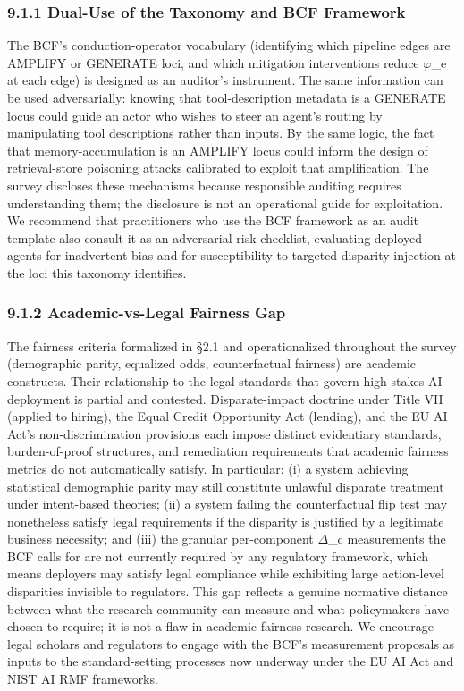 \documentclass[10pt]{article}
\begin{document}
\subsubsection*{9.1.1 Dual-Use of the Taxonomy and BCF Framework}

The BCF's conduction-operator vocabulary (identifying which pipeline edges are AMPLIFY or GENERATE loci, and which mitigation interventions reduce $\varphi$\_e at each edge) is designed as an auditor's instrument. The same information can be used adversarially: knowing that tool-description metadata is a GENERATE locus \cite{sneh2025tooltweak} could guide an actor who wishes to steer an agent's routing by manipulating tool descriptions rather than inputs. By the same logic, the fact that memory-accumulation is an AMPLIFY locus could inform the design of retrieval-store poisoning attacks \cite{wang2025bias} calibrated to exploit that amplification. The survey discloses these mechanisms because responsible auditing requires understanding them; the disclosure is not an operational guide for exploitation. We recommend that practitioners who use the BCF framework as an audit template also consult it as an adversarial-risk checklist, evaluating deployed agents for inadvertent bias and for susceptibility to targeted disparity injection at the loci this taxonomy identifies.

\subsubsection*{9.1.2 Academic-vs-Legal Fairness Gap}

The fairness criteria formalized in \S{}2.1 and operationalized throughout the survey (demographic parity, equalized odds, counterfactual fairness) are academic constructs. Their relationship to the legal standards that govern high-stakes AI deployment is partial and contested. Disparate-impact doctrine under Title VII (applied to hiring), the Equal Credit Opportunity Act (lending), and the EU AI Act's non-discrimination provisions each impose distinct evidentiary standards, burden-of-proof structures, and remediation requirements that academic fairness metrics do not automatically satisfy. In particular: (i) a system achieving statistical demographic parity may still constitute unlawful disparate treatment under intent-based theories; (ii) a system failing the counterfactual flip test may nonetheless satisfy legal requirements if the disparity is justified by a legitimate business necessity; and (iii) the granular per-component $\Delta$\_c measurements the BCF calls for are not currently required by any regulatory framework, which means deployers may satisfy legal compliance while exhibiting large action-level disparities invisible to regulators. This gap reflects a genuine normative distance between what the research community can measure and what policymakers have chosen to require; it is not a flaw in academic fairness research. We encourage legal scholars and regulators to engage with the BCF's measurement proposals as inputs to the standard-setting processes now underway under the EU AI Act and NIST AI RMF frameworks.
\end{document}
